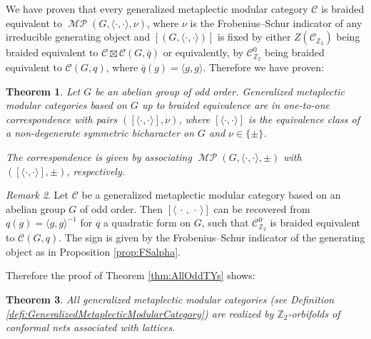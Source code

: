 \documentclass[twoside,11pt,reqno]{amsart}
\newtheorem{thm}{Theorem}[section]
\theoremstyle{definition}
\theoremstyle{remark}
\newtheorem{rmk}[thm]{Remark}
\newcommand{\slot}{{~\cdot~}}
\newcommand{\cC}{\mathcal{C}}
\newcommand{\ZZ}{\mathbb{Z}}
\DeclareMathOperator*{\MP}{\mathcal{MP}}
\newcommand{\bi}[2]{\langle #1,#2\rangle}
\renewcommand{\slot}{\,\cdot\,}
\newcommand{\bislotslot}{\bi\cdot\cdot}
\begin{document}
We have proven that every generalized metaplectic modular category $\cC$ is braided equivalent 
to $\MP(G,\bislotslot,\nu)$, where $\nu$ is the Frobenius--Schur indicator of
any irreducible generating object and $[(G,\bislotslot)]$ is fixed by 
either $Z(\cC_{\ZZ_2})$ being braided equivalent to 
$\cC\boxtimes \cC(G,\bar{q})$
or equivalently, 
by $\cC^0_{\ZZ_2}$ being braided equivalent to $\cC(G,q)$, 
where $\bar q(g)=\bi gg$. Therefore we have proven:
\begin{thm}
  \label{thm:MPclass1}
  Let $G$ be an abelian group of odd order. 
  Generalized metaplectic modular categories based on $G$ up to 
  braided equivalence are in one-to-one correspondence
  with pairs $([\bislotslot],\nu)$, where
  $[\bislotslot]$ is the equivalence class of a non-degenerate symmetric 
  bicharacter on $G$ and $\nu\in\{\pm\}$. 

  The correspondence is given by associating $\MP(G,\bislotslot,\pm)$ 
  with $([\bislotslot],\pm)$, respectively.
\end{thm}
\begin{rmk}
  Let $\cC$ be a generalized metaplectic modular category based on an 
  abelian group $G$ of odd order. 
  Then $[\bi\slot\slot]$ can be recovered from  $q(g)=\bi gg^{-1}$
  for $q$ a quadratic form on $G$, such that $\cC_{\ZZ_2}^0$ 
  is braided equivalent to $\cC(G,q)$. 
  The sign is given by the Frobenius--Schur indicator of the generating object 
  as in Proposition \ref{prop:FSalpha}.
\end{rmk}
Therefore the proof of Theorem \ref{thm:AllOddTYs} shows:
\begin{thm} 
  \label{thm:MPRealization}
  All generalized metaplectic modular categories (see Definition 
    \ref{defi:GeneralizedMetaplecticModularCategory})
  are realized by $\ZZ_2$-orbifolds of conformal nets associated with lattices.
\end{thm}
\end{document}
